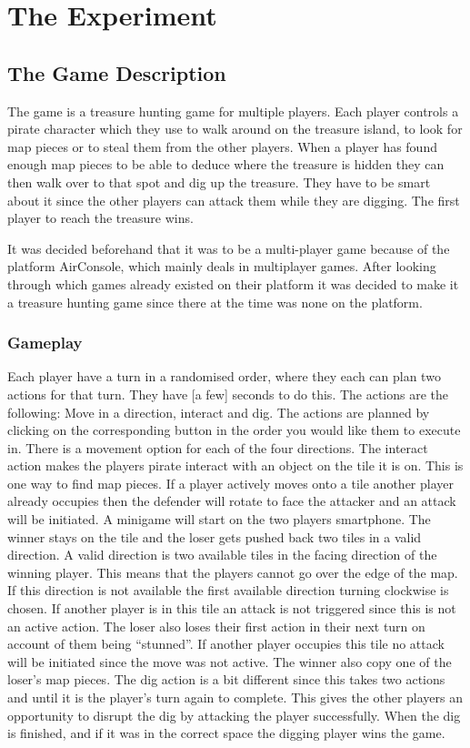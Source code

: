 \chapter{The Experiment}\label{ch:experiment}
\section{The Game Description}
The game is a treasure hunting game for multiple players. Each player controls a pirate character which they use to walk around on the treasure island, to look for map pieces or to steal them from the other players. When a player has found enough map pieces to be able to deduce where the treasure is hidden they can then walk over to that spot and dig up the treasure. They have to be smart about it since the other players can attack them while they are digging. The first player to reach the treasure wins. 


It was decided beforehand that it was to be a multi-player game because of the platform AirConsole, which mainly deals in multiplayer games. After looking through which games already existed on their platform it was decided to make it a treasure hunting game since there at the time was none on the platform. 



\subsection{Gameplay}
Each player have a turn in a randomised order, where they each can plan two actions for that turn. They have [a few] seconds to do this. The actions are the following: Move in a direction, interact and dig. The actions are planned by clicking on the corresponding button in the order you would like them to execute in. There is a movement option for each of the four directions. The interact action makes the players pirate interact with an object on the tile it is on. This is one way to find map pieces. If a player actively moves onto a tile another player already occupies then the defender will rotate to face the attacker and an attack will be initiated. A minigame will start on the two players smartphone. The winner stays on the tile and the loser gets pushed back two tiles in a valid direction. A valid direction is two available tiles in the facing direction of the winning player. This means that the players cannot go over the edge of the map. If this direction is not available the first available direction turning clockwise is chosen. If another player is in this tile an attack is not triggered since this is not an active action. The loser also loses their first action in their next turn on account of them being “stunned”. If another player occupies this tile no attack will be initiated since the move was not active. The winner also copy one of the loser’s map pieces. The dig action is a bit different since this takes two actions and until it is the player’s turn again to complete. This gives the other players an opportunity to disrupt the dig by attacking the player successfully. When the dig is finished, and if it was in the correct space the digging player wins the game. 


